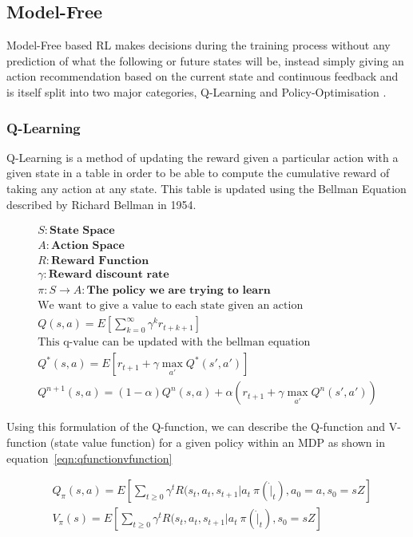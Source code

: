 \documentclass{article}
\begin{document}

\subsection{Model-Free}
Model-Free based RL makes decisions during the training process without any prediction of what the following or future states will be, instead simply giving an action recommendation based on the current state and continuous feedback and is itself split into two major categories, Q-Learning and Policy-Optimisation \cite{Huang2020Model-basedLearning}.
 \\
 \subsubsection{Q-Learning}
Q-Learning is a method of updating the reward given a particular action with a given state in a table in order to be able to compute the cumulative reward of taking any action at any state. This table is updated using the Bellman Equation described by Richard Bellman in 1954\cite{RichardBellman1954TheProgramming}.


\begin{align*}
&    S: \textbf{State Space} \\
&    A: \textbf{Action Space} \\
&    R: \textbf{Reward Function} \\
&    \gamma: \textbf{Reward discount rate} \\
&    \pi : S \rightarrow A: \textbf{The policy we are trying to learn}
&    \\
&    \text{We want to give a value to each state given an action }\\
&    Q(s,a) = E[\sum^{\infty}_{k=0}\gamma^k r_{t+k+1}] \\
&    \text{This q-value can be updated with the bellman equation} \\
&    Q^*(s,a) = E[r_{t+1} + \gamma \max_{a'} Q^*(s',a')] \\
&    Q^{n+1}(s,a) = (1-\alpha)Q^{n}(s,a) + \alpha(r_{t+1} + \gamma \max_{a'} Q^{n}(s',a'))
\end{align*}

Using this formulation of the Q-function, we can describe the Q-function and V-function (state value function) for a given policy within an MDP as shown in equation~\ref{eqn:qfunctionvfunction}

\begin{subequations}\label{eqn:qfunctionvfunction}
\begin{align}
    & Q_\pi(s,a) = E[\sum_{t \ge 0} \gamma^t R(s_t, a_t, s_{t+1} | a_t ~ \pi(\dot | _t), a_0 = a, s_0 = sZ] \\
    & V_\pi(s) = E[\sum_{t \ge 0} \gamma^t R(s_t, a_t, s_{t+1} | a_t ~ \pi(\dot | _t), s_0 = sZ] \\
\end{align}
\end{subequations}
\end{document}
